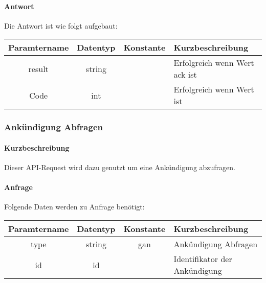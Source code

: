 \paragraph{Antwort}Die Antwort ist wie folgt aufgebaut:
\begin{table}[H]
	\begin{tabular}{|c|c|c|p{6.5cm}|}
		\hline
		\textbf{Paramtername} & \textbf{Datentyp} & \textbf{Konstante} & \textbf{Kurzbeschreibung}                                                                                               \\ \hline
		result              & string           &                 & Erfolgreich wenn Wert {\glqq ack\grqq} ist \\ \hline
		Code                & int              &                 & Erfolgreich wenn Wert {\glqq 0\grqq} ist \\ \hline
	\end{tabular}
\end{table}
\subsubsection{Ankündigung Abfragen}
\paragraph{Kurzbeschreibung}Dieser API-Request wird dazu genutzt um eine Ankündigung abzufragen.
\paragraph{Anfrage}Folgende Daten werden zu Anfrage benötigt:
\begin{table}[H]
	\begin{tabular}{|c|c|c|p{6.5cm}|}
		\hline
		\textbf{Paramtername} & \textbf{Datentyp} & \textbf{Konstante} & \textbf{Kurzbeschreibung}                                                                                               \\ \hline
		type                & string            & gan                & Ankündigung Abfragen \\ \hline
		id                  & id                &                    & Identifikator der Ankündigung \\ \hline
	\end{tabular}
\end{table}
